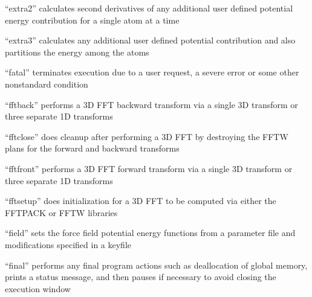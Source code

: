 \documentclass[letterpaper,11pt,english]{sphinxmanual}
\begin{document}
\sphinxAtStartPar
“extra2” calculates second derivatives of any additional user defined potential energy contribution for a single atom at a time

\sphinxAtStartPar
{}

\sphinxAtStartPar
“extra3” calculates any additional user defined potential contribution and also partitions the energy among the atoms

\sphinxAtStartPar
{}

\sphinxAtStartPar
“fatal” terminates execution due to a user request, a severe error or some other nonstandard condition

\sphinxAtStartPar
{}

\sphinxAtStartPar
“fftback” performs a 3\sphinxhyphen{}D FFT backward transform via a single 3\sphinxhyphen{}D transform or three separate 1\sphinxhyphen{}D transforms

\sphinxAtStartPar
{}

\sphinxAtStartPar
“fftclose” does cleanup after performing a 3\sphinxhyphen{}D FFT by destroying the FFTW plans for the forward and backward transforms

\sphinxAtStartPar
{}

\sphinxAtStartPar
“fftfront” performs a 3\sphinxhyphen{}D FFT forward transform via a single 3\sphinxhyphen{}D transform or three separate 1\sphinxhyphen{}D transforms

\sphinxAtStartPar
{}

\sphinxAtStartPar
“fftsetup” does initialization for a 3\sphinxhyphen{}D FFT to be computed via either the FFTPACK or FFTW libraries

\sphinxAtStartPar
{}

\sphinxAtStartPar
“field” sets the force field potential energy functions from a parameter file and modifications specified in a keyfile

\sphinxAtStartPar
{}

\sphinxAtStartPar
“final” performs any final program actions such as deallocation of global memory, prints a status message, and then pauses if necessary to avoid closing the execution window

\sphinxAtStartPar
{}
\end{document}
